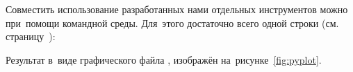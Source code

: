 \inputminted[linenos, fontsize=\small]{py}{projects/02/plot.py}

Совместить использование разработанных нами отдельных инструментов можно при~помощи командной среды. Для~этого достаточно всего одной строки (см. страницу~\pageref{sect:shell}):

\noindent Результат в~виде графического файла , изображён на~рисунке~\ref{fig:pyplot}.
